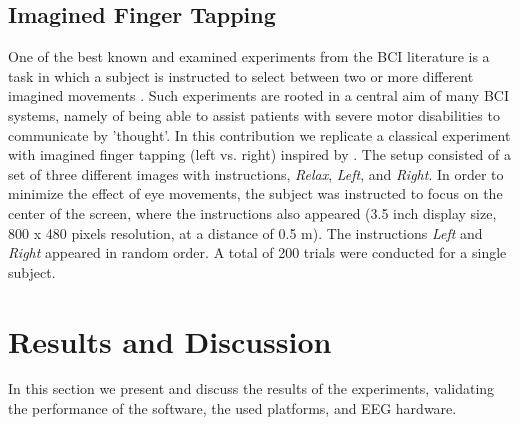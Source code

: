 \documentclass[10pt]{article}
\begin{document}
	\subsection{Imagined Finger Tapping}
One of the best known and examined experiments from the BCI literature is a task in which a subject is instructed to select between two or more different imagined movements \cite{Muller-Gerking1999:DesigningOptimalSpatialFilters,Babiloni2000:LinearClassLowResEEGImagHand,Dornhege2004,Blankertz2006:BerlinBCI}. Such experiments are rooted in a central aim of many BCI systems, namely of being able to assist patients with severe motor disabilities to communicate by 'thought'.
In this contribution we replicate a classical experiment with imagined finger tapping (left vs. right) inspired by \cite{Blankertz2006:BerlinBCI}. The setup consisted of a set of three different images with instructions, \textit{Relax}, \textit{Left}, and \textit{Right}. In order to minimize the effect of eye movements, the subject was instructed to focus on the center of the screen, where the instructions also appeared (3.5 inch display size, 800 x 480 pixels resolution, at a distance of 0.5 m). The instructions \textit{Left} and \textit{Right} appeared in random order. A total of 200 trials were conducted for a single subject.

\iffalse{
To illustrate the potential for performing such study in a completely mobile context all stimulus delivery and data recording were carried out using the SBS2 framework, while post-processing and decoding were conducted off-line using standard analysis tools. In particular, we applied a common spatial pattern (CSP) approach \cite{Muller-Gerking1999:DesigningOptimalSpatialFilters} to extract spatial filters that maximize the variance for one class while minimizing the variance of the other class and vice versa. A quadratic Bayesian classifier for decoding was applied on features transformed as in \cite{Muller-Gerking1999:DesigningOptimalSpatialFilters}.
}\fi

















 \section{Results and Discussion}
In this section we present and discuss the results of the experiments, validating the performance of the software, the used platforms, and EEG hardware.
\end{document}
